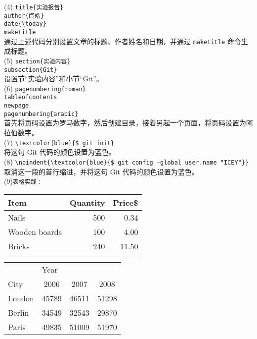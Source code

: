 \documentclass[a4paper, 12pt]{article}
\begin{document}
\noindent(4) \texttt{title\{实验报告\}} \\
\texttt{author\{闫皓\}} \\
\texttt{date\{\textbackslash today\}} \\
\texttt{maketitle} \\
通过上述代码分别设置文章的标题、作者姓名和日期，并通过 \texttt{maketitle} 命令生成标题。\\

\noindent(5) \texttt{section\{实验内容\}} \\
\texttt{subsection\{Git\}} \\
设置节“实验内容”和小节“Git”。\\

\noindent(6) \texttt{pagenumbering\{roman\}} \\
\texttt{tableofcontents} \\
\texttt{newpage} \\
\texttt{pagenumbering\{arabic\}} \\
首先将页码设置为罗马数字，然后创建目录，接着另起一个页面，将页码设置为阿拉伯数字。\\

\noindent(7) \texttt{\textbackslash textcolor\{blue\}\{\$ git init\}} \\
将这句 Git 代码的颜色设置为蓝色。\\

\noindent(8) \texttt{\textbackslash noindent\{\textbackslash textcolor\{blue\}\{\$ git config --global user.name "ICEY"\}\}} \\
取消这一段的首行缩进，并将这句 Git 代码的颜色设置为蓝色。\\
\noindent(9)\texttt{表格实践：}\\
\begin{tabular}{l|r|r}
Item			& Quantity 	& Price\$\\
\hline
Nails			& 500	& 0.34\\
Wooden boards	& 100	&4.00\\
Bricks		&240		&11.50\\
\end{tabular}

\begin{tabular}{l|ccc}
	& \multicolumn{3}{l}{Year} \\
\cline{2-4}
City		& 2006	& 2007	& 2008 \\
\hline
London	& 45789	& 46511	& 51298 \\
Berlin	& 34549	& 32543	& 29870 \\
Paris		& 49835	& 51009	& 51970 \\
\end{tabular}
\end{document}
